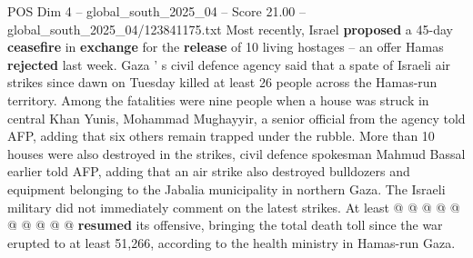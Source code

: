 \begin{textsample}{POS Dim 4 – global\_south\_2025\_04 – Score 21.00 – global\_south\_2025\_04/123841175.txt}
Most recently, Israel \textbf{proposed} a 45-day \textbf{ceasefire} in \textbf{exchange} for the \textbf{release} of 10 living hostages -- an offer Hamas \textbf{rejected} last week.
Gaza ' s civil defence agency said that a spate of Israeli air strikes since dawn on Tuesday killed at least 26 people across the Hamas-run territory.
Among the fatalities were nine people when a house was struck in central Khan Yunis, Mohammad Mughayyir, a senior official from the agency told AFP, adding that six others remain trapped under the rubble.
More than 10 houses were also destroyed in the strikes, civil defence spokesman Mahmud Bassal earlier told AFP, adding that an air strike also destroyed bulldozers and equipment belonging to the Jabalia municipality in northern Gaza.
The Israeli military did not immediately comment on the latest strikes.
At least @ @ @ @ @ @ @ @ @ @ \textbf{resumed} its offensive, bringing the total death toll since the war erupted to at least 51,266, according to the health ministry in Hamas-run Gaza.

\end{textsample}
